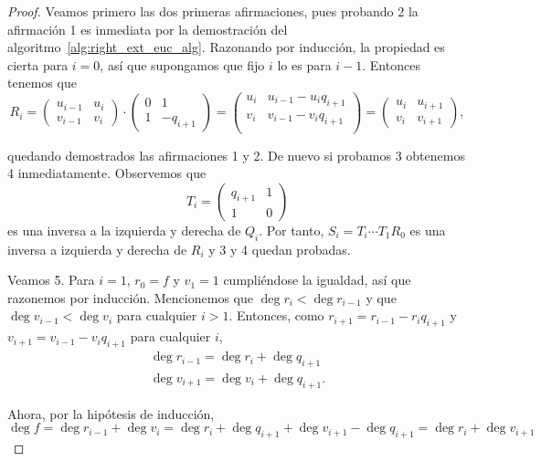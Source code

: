 \begin{proof}
Veamos primero las dos primeras afirmaciones, pues probando 2 la afirmación 1 es inmediata por la demostración del algoritmo~\ref{alg:right_ext_euc_alg}. Razonando por inducción, la propiedad es cierta para \(i = 0\), así que supongamos que fijo \(i\) lo es para  \(i-1\). Entonces tenemos que
\[
R_i =
\begin{pmatrix}
    u_{i-1} & u_{i} \\
    v_{i-1} & v_{i}
\end{pmatrix}
\cdot
\begin{pmatrix}
    0 & 1 \\
    1 & -q_{i+1}
\end{pmatrix}
=
\begin{pmatrix}
    u_i & u_{i-1} - u_{i}q_{i+1} \\
    v_i & v_{i-1} - v_{i}q_{i+1} \\
\end{pmatrix}
=
\begin{pmatrix}
    u_{i} & u_{i+1} \\
    v_{i} & v_{i+1}
\end{pmatrix}
,\]

quedando demostrados las afirmaciones 1 y 2. De nuevo si probamos 3 obtenemos 4 inmediatamente. Observemos que \[T_i =
\begin{pmatrix}
q_{i+1} & 1 \\
1 & 0
\end{pmatrix} \]
es una inversa a la izquierda y derecha de \(Q_i\). Por tanto, \(S_i = T_i \cdots T_1 R_0\) es una inversa a izquierda y derecha de \(R_i\) y 3 y 4 quedan probadas.

Veamos 5. Para \(i = 1\),  \(r_0 = f\) y  \(v_1 = 1\) cumpliéndose la igualdad, así que razonemos por inducción. Mencionemos que \(\deg r_i < \deg r_{i-1}\) y que \(\deg v_{i-1} < \deg v_i\) para cualquier \(i > 1\). Entonces, como \(r_{i+1} = r_{i-1} - r_{i}q_{i+1}\) y \(v_{i+1} = v_{i-1} - v_{i}q_{i+1} \) para cualquier \(i\),
 \[
\begin{aligned}
    \deg r_{i-1} = \deg r_{i} + \deg q_{i+1} \\
    \deg v_{i+1} = \deg v_i + \deg q_{i+1}.
\end{aligned}
\]

Ahora, por la hipótesis de inducción, \(\deg f = \deg r_{i-1} + \deg v_{i} = \deg r_{i} + \deg q_{i+1} + \deg v_{i+1} - \deg q_{i+1} = \deg r_i + \deg v_{i+1}\)
\end{proof}

